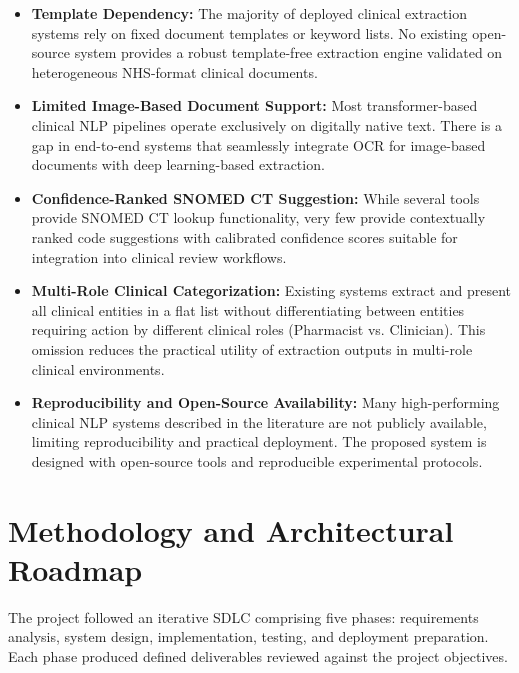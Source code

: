\begin{itemize}
    \item \textbf{Template Dependency:} The majority of deployed clinical extraction systems rely on fixed document templates or keyword lists. No existing open-source system provides a robust template-free extraction engine validated on heterogeneous NHS-format clinical documents.
    
    \item \textbf{Limited Image-Based Document Support:} Most transformer-based clinical NLP pipelines operate exclusively on digitally native text. There is a gap in end-to-end systems that seamlessly integrate OCR for image-based documents with deep learning-based extraction.
    
    \item \textbf{Confidence-Ranked SNOMED CT Suggestion:} While several tools provide SNOMED CT lookup functionality, very few provide contextually ranked code suggestions with calibrated confidence scores suitable for integration into clinical review workflows.
    
    \item \textbf{Multi-Role Clinical Categorization:} Existing systems extract and present all clinical entities in a flat list without differentiating between entities requiring action by different clinical roles (Pharmacist vs. Clinician). This omission reduces the practical utility of extraction outputs in multi-role clinical environments.
    
    \item \textbf{Reproducibility and Open-Source Availability:} Many high-performing clinical NLP systems described in the literature are not publicly available, limiting reproducibility and practical deployment. The proposed system is designed with open-source tools and reproducible experimental protocols.
\end{itemize}
\section{Methodology and Architectural Roadmap}

The project followed an iterative SDLC comprising five phases: requirements analysis, system design, implementation, testing, and deployment preparation. Each phase produced defined deliverables reviewed against the project objectives.

